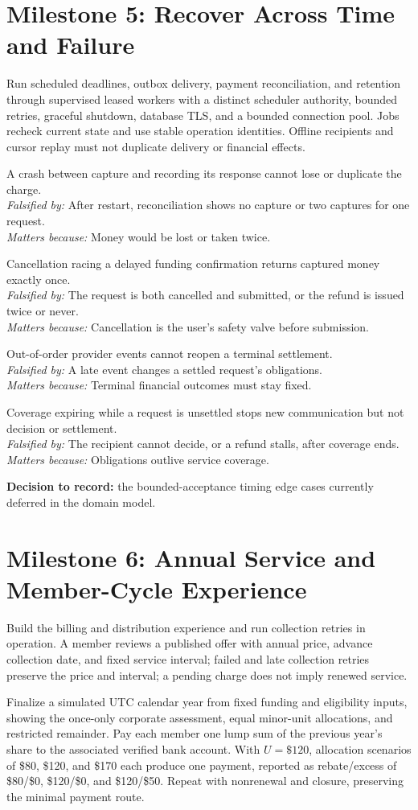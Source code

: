 \documentclass[11pt]{article}
\newenvironment{claims}{\begin{description}[leftmargin=1em,style=nextline,itemsep=0.4em]}{\end{description}}
\newcommand{\claim}[4]{\Needspace{6\baselineskip}\item[Claim (#1).] #2\\
    \textit{Falsified by:} #3\\
    \textit{Matters because:} #4}
\begin{document}
\section{Milestone 5: Recover Across Time and Failure}

Run scheduled deadlines, outbox delivery, payment reconciliation, and retention
through supervised leased workers with a distinct scheduler authority, bounded
retries, graceful shutdown, database TLS, and a bounded connection pool. Jobs
recheck current state and use stable operation identities. Offline recipients and
cursor replay must not duplicate delivery or financial effects.

\begin{claims}
\claim{PostgreSQL, crash injection}{A crash between capture and recording its response cannot lose or duplicate the charge.}
    {After restart, reconciliation shows no capture or two captures for one request.}
    {Money would be lost or taken twice.}
\claim{PostgreSQL, race}{Cancellation racing a delayed funding confirmation returns captured money exactly once.}
    {The request is both cancelled and submitted, or the refund is issued twice or never.}
    {Cancellation is the user's safety valve before submission.}
\claim{PostgreSQL}{Out-of-order provider events cannot reopen a terminal settlement.}
    {A late event changes a settled request's obligations.}
    {Terminal financial outcomes must stay fixed.}
\claim{PostgreSQL}{Coverage expiring while a request is unsettled stops new communication but not decision or settlement.}
    {The recipient cannot decide, or a refund stalls, after coverage ends.}
    {Obligations outlive service coverage.}
\end{claims}

\textbf{Decision to record:} the bounded-acceptance timing edge cases currently
deferred in the domain model.

\section{Milestone 6: Annual Service and Member-Cycle Experience}

Build the billing and distribution experience and run collection retries in
operation. A member reviews a published offer with annual price, advance
collection date, and fixed service interval; failed and late collection retries
preserve the price and interval; a pending charge does not imply renewed service.

Finalize a simulated UTC calendar year from fixed funding and eligibility inputs,
showing the once-only corporate assessment, equal minor-unit allocations, and
restricted remainder. Pay each member one lump sum of the previous year's share
to the associated verified bank account. With $U=\$120$, allocation scenarios of
\$80, \$120, and \$170 each produce one payment, reported as rebate/excess of
\$80/\$0, \$120/\$0, and \$120/\$50. Repeat with nonrenewal and closure,
preserving the minimal payment route.
\end{document}
